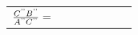 {\begin{tabular}[t]{|l|l|l|}
    
        
                \begin{math}\frac{{C}^{\text{'}\text{'}}{B}^{\text{'}\text{'}}}{{A}^{\text{'}\text{'}}{C}^{\text{'}\text{'}}}=\phantom{\rule{42.67912pt}{0ex}}\end{math}
     \tabularnewline\cline{1-1}\cline{2-2}\cline{3-3}
    \end{tabular}} %
      \addtocounter{footnote}{-0}
      
    
